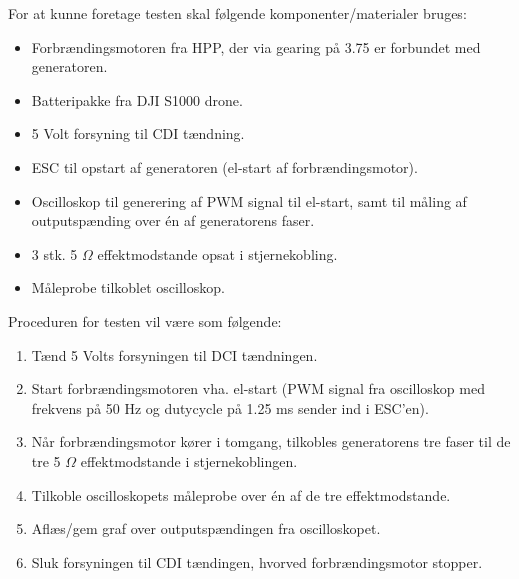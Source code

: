 For at kunne foretage testen skal følgende komponenter/materialer bruges:
\begin{itemize}
\item Forbrændingsmotoren fra HPP, der via gearing på 3.75 er forbundet med generatoren.
\item Batteripakke fra DJI S1000 drone.
\item 5 Volt forsyning til CDI tændning.
\item ESC til opstart af generatoren (el-start af forbrændingsmotor).
\item Oscilloskop til generering af PWM signal til el-start, samt til måling af outputspænding over én af generatorens faser.
\item 3 stk. 5 $\Omega$ effektmodstande opsat i stjernekobling.
\item Måleprobe tilkoblet oscilloskop.
\end{itemize}

Proceduren for testen vil være som følgende:

\begin{enumerate}
\item Tænd 5 Volts forsyningen til DCI tændningen.
\item Start forbrændingsmotoren vha. el-start (PWM signal fra oscilloskop med frekvens på 50 Hz og dutycycle på 1.25 ms sender ind i ESC’en).
\item Når forbrændingsmotor kører i tomgang, tilkobles generatorens tre faser til de tre 5 $\Omega$ effektmodstande i stjernekoblingen.
\item Tilkoble oscilloskopets måleprobe over én af de tre effektmodstande.
\item Aflæs/gem graf over outputspændingen fra oscilloskopet.
\item Sluk forsyningen til CDI tændingen, hvorved forbrændingsmotor stopper.
\end{enumerate}

